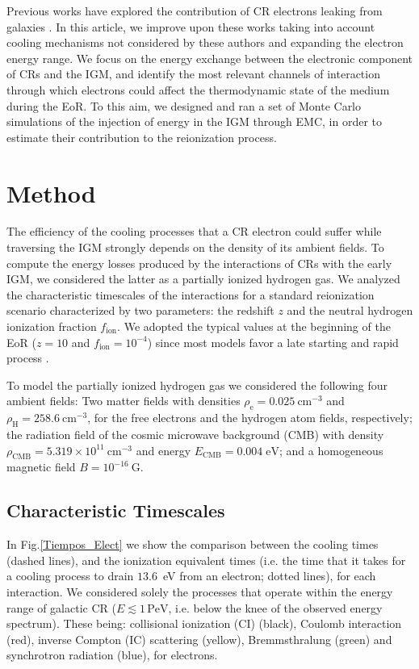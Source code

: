\documentclass[baaa]{baaa}
\begin{document}
Previous works have explored the contribution of CR electrons leaking from galaxies \citep{Tueros2014, Leite, Douna}. In this article, we improve upon these works taking into account cooling mechanisms not considered by these authors and expanding the electron energy range. We focus on the energy exchange between the electronic component of CRs and the IGM, and identify the most relevant channels of interaction through which electrons could affect the thermodynamic state of the medium during the EoR. To this aim, we designed and ran a set of Monte Carlo simulations of the injection of energy in the IGM through EMC, in order to estimate their contribution to the reionization process.
 

\section{Method}

The efficiency of the cooling processes that a CR electron could suffer while traversing the IGM strongly depends on the density of its ambient fields. To compute the energy losses produced by the interactions of CRs with the early IGM, we considered the latter as a partially ionized hydrogen gas. We analyzed the characteristic timescales of the interactions for a standard reionization scenario characterized by two parameters: the redshift $z$ and the neutral hydrogen ionization fraction $f_{\mathrm{ion}}$. We adopted the typical values at the beginning of the EoR ($z=10$ and $f_{\mathrm{ion}}=10^{-4}$) since most models favor a late starting and rapid process \citep{Greig2017}.

To model the partially ionized hydrogen gas we considered the following four ambient fields: Two matter fields with densities $\rho_{\mathrm{e}} =0.025 \: \mathrm{cm}^{-3}$ and $\rho_{\mathrm{H}}=258.6 \: \mathrm{cm}^{-3}$, for the free electrons and the hydrogen atom fields, respectively; the radiation field of the cosmic microwave background (CMB) with density $\rho_{\mathrm{CMB}}=5.319\times 10^{11} \: \mathrm{cm}^{-3}$ and energy $E_{\mathrm{CMB}}=0.004  \;  \mathrm{eV}$; and a homogeneous magnetic field $B=10^{-16} \: \mathrm{G}$.



\subsection{Characteristic Timescales}

In Fig.\ref{Tiempos_Elect} we show the comparison between the cooling times (dashed lines), and the ionization equivalent times (i.e. the time that it takes for a cooling process to drain $13.6$~eV from an electron; dotted lines), for each interaction. We considered solely the processes that operate within the energy range of galactic CR ($E \lesssim 1\,\mathrm{PeV}$, i.e. below the knee of the observed energy spectrum). These being: collisional ionization (CI) (black), Coulomb interaction (red), inverse Compton (IC) scattering (yellow), Bremmsthralung (green) and synchrotron radiation (blue), for electrons.  
\end{document}
